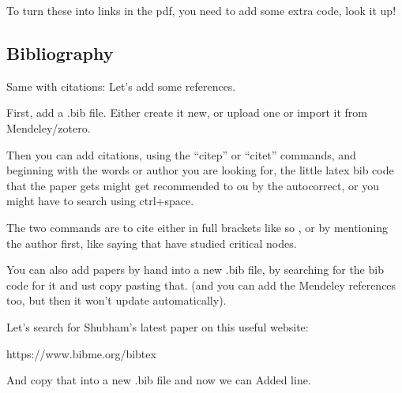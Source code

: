 \documentclass{article}
\begin{document}
    To turn these into links in the pdf, you need to add some extra code, look it up!

\vspace{1cm}

\subsection{Bibliography }

Same with citations: Let's add some references.

First, add a .bib file. Either create it new, or upload one or import it from Mendeley/zotero.

Then you can add citations, using the ``citep'' or ``citet'' commands, and beginning with the words or author you are looking for, the little latex bib code that the paper gets might get recommended to ou by the autocorrect, or you might have to search using ctrl+space. 

The two commands are to cite either in full brackets like so \citep{tiwari_jha_singh_2020}, or by mentioning the author first, like saying that have studied critical nodes.

You can also add papers by hand into a new .bib file, by searching for the bib code for it and ust copy pasting that. (and you can add the Mendeley references too, but then it won't update automatically). 

Let's search for Shubham's latest paper on this useful website:

https://www.bibme.org/bibtex

And copy that into a new .bib file and now we can 
Added line.


\end{document}
